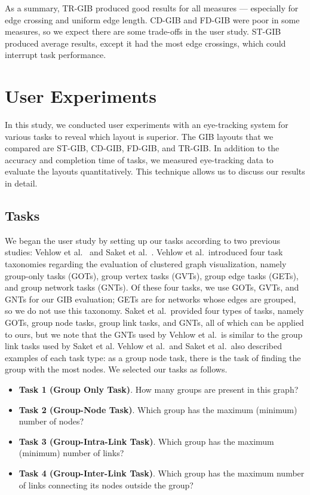 \documentclass[review]{vgtc}                 %
\begin{document}
As a summary, TR-GIB produced good results for all measures --- especially for edge crossing and uniform edge length.
CD-GIB and FD-GIB were poor in some measures, so we expect there are some trade-offs in the user study.
ST-GIB produced average results, except it had the most edge crossings, which could interrupt task performance.

%
\section{User Experiments}
%
In this study, we conducted user experiments with an eye-tracking system for various tasks to reveal which layout is superior.
The GIB layouts that we compared are ST-GIB, CD-GIB, FD-GIB, and TR-GIB.
In addition to the accuracy and completion time of tasks, we measured eye-tracking data to evaluate the layouts quantitatively.
This technique allows us to discuss our results in detail.


\subsection{Tasks}
\label{task}
We began the user study by setting up our tasks according to two previous studies: Vehlow et al.~\cite{Vehlow2017VisualizingGS} and Saket et al.~\cite{saket2014group}.
Vehlow et al.\ introduced four task taxonomies regarding the evaluation of clustered graph visualization, namely group-only tasks (GOTs), group vertex tasks (GVTs), group edge tasks (GETs), and group network tasks (GNTs).
Of these four tasks, we use GOTs, GVTs, and GNTs for our GIB evaluation; GETs are for networks whose edges are grouped, so we do not use this taxonomy.
Saket et al.\ provided four types of tasks, namely GOTs, group node tasks, group link tasks, and GNTs, all of which can be applied to ours, but we note that the GNTs used by Vehlow et al.\ is similar to the group link tasks used by Saket et al.
Vehlow et al.\ and Saket et al.\ also described examples of each task type: as a group node task, there is the task of finding the group with the most nodes.
We selected our tasks as follows.

\begin{itemize}
\item {\bf Task 1 (Group Only Task)}. How many groups are present in this graph?
\item {\bf Task 2 (Group-Node Task)}. Which group has the maximum (minimum) number of nodes?
\item {\bf Task 3 (Group-Intra-Link Task)}. Which group has the maximum (minimum) number of links?
\item {\bf Task 4 (Group-Inter-Link Task)}. Which group has the maximum number of links connecting its nodes outside the group?
\end{itemize}
\end{document}
